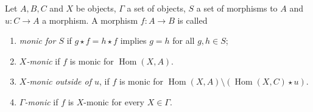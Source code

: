 \begin{definition}
    Let $A,B,C$ and $X$ be objects, $\Gamma$ a set of objects, $S$ a set of morphisms to $A$ and $u:C \mathop{\to} A$ a morphism. A morphism $f : A \mathop{\to} B$ is called 
    \begin{enumerate}[label=(\roman*)] 
        \item 
            \emph{monic for $S$} 
            if $g \mathop{\star} f \mathop{=} h \mathop{\star} f$ implies $g \mathop{=} h$ for all $g, h \mathop{\in} S$;
        \item 
            \emph{$X$-monic} if $f$ is monic for $\operatorname{Hom}(X, A)$.
        \item \emph{$X$-monic outside of $u$}, if $f$ is monic for \( \operatorname{Hom}(X,A) \mathop{\setminus} \left ( \operatorname{Hom}(X,C) \mathop{\star} u \right ) \).
        \item  \emph{$\Gamma$-monic} if $f$ is $X$-monic for every $X \mathop{\in} \Gamma$.
    \end{enumerate}
\end{definition} 
